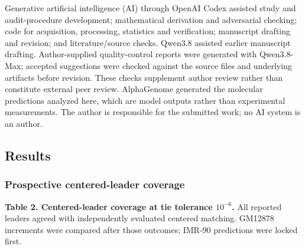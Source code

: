 \documentclass[
  11pt,
]{article}
\begin{document}
Generative artificial intelligence (AI) through OpenAI Codex assisted
study and audit-procedure development; mathematical derivation and
adversarial checking; code for acquisition, processing, statistics and
verification; manuscript drafting and revision; and literature/source
checks. Qwen3.8 assisted earlier manuscript drafting. Author-supplied
quality-control reports were generated with Qwen3.8-Max; accepted
suggestions were checked against the source files and underlying
artifacts before revision. These checks supplement author review rather
than constitute external peer review. AlphaGenome generated the
molecular predictions analyzed here, which are model outputs rather than
experimental measurements. The author is responsible for the submitted
work; no AI system is an author.

\subsection{Results}\label{results}

\subsubsection{Prospective centered-leader
coverage}\label{prospective-centered-leader-coverage}

\textbf{Table 2. Centered-leader coverage at tie tolerance \(10^{-6}\).}
All reported leaders agreed with independently evaluated centered
matching. GM12878 increments were compared after those outcomes; IMR-90
predictions were locked first.
\end{document}

